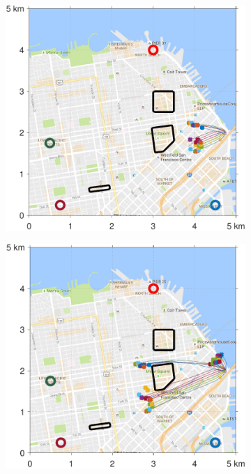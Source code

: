 \begin{figure}[!htb]
 \centering
\begin{subfigure}{0.5\textwidth}
  \includegraphics[width=\columnwidth]{figs/sf_d6sep0_s1}
  \subcaption{}
  \label{fig:sf_d6sep0_s1}
\end{subfigure}%
\begin{subfigure}{0.5\textwidth}
  \includegraphics[width=\columnwidth]{figs/sf_d6sep0_s2}
  \subcaption{}
  \label{fig:sf_d6sep0_s2}
\end{subfigure}%


\end{figure}
